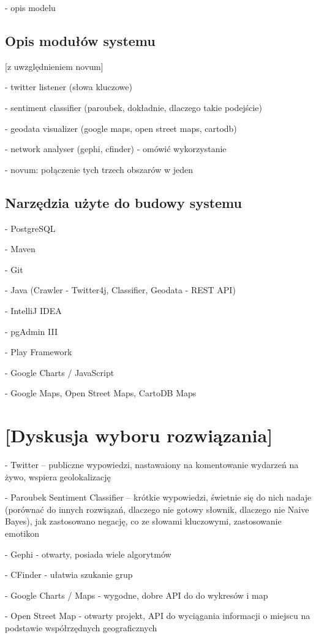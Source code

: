 - opis modelu

\subsection{Opis modułów systemu}
[z uwzględnieniem novum]

- twitter listener (słowa kluczowe)

- sentiment classifier (paroubek, dokładnie, dlaczego takie podejście)

- geodata visualizer (google maps, open street maps, cartodb)

- network analyser (gephi, cfinder) - omówić wykorzystanie

- novum: połączenie tych trzech obszarów w jeden

\subsection{Narzędzia użyte do budowy systemu}
- PostgreSQL

- Maven

- Git

- Java (Crawler - Twitter4j, Classifier, Geodata - REST API)

- IntelliJ IDEA

- pgAdmin III

- Play Framework

- Google Charts / JavaScript

- Google Maps, Open Street Maps, CartoDB Maps 


\newpage \section{[Dyskusja wyboru rozwiązania]}
- Twitter -- publiczne wypowiedzi, nastawaiony na komentowanie wydarzeń na żywo,
wspiera geolokalizację

- Paroubek Sentiment Classifier -- krótkie wypowiedzi, świetnie się do nich
nadaje (porównać do innych rozwiązań, dlaczego nie gotowy słownik,
dlaczego nie Naive Bayes), jak zastosowano negację, co ze słowami kluczowymi,
zastosowanie emotikon

- Gephi - otwarty, posiada wiele algorytmów

- CFinder - ułatwia szukanie grup

- Google Charts / Maps - wygodne, dobre API do do wykresów i map

- Open Street Map - otwarty projekt, API do wyciągania informacji o miejscu
na podstawie współrzędnych geograficznych


